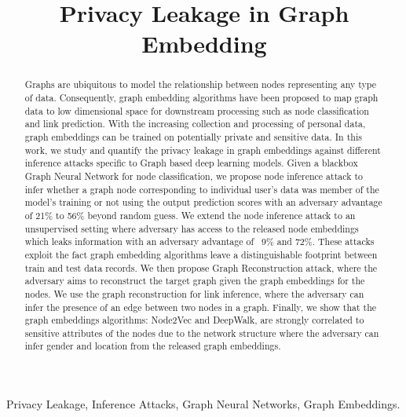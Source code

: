 \documentclass[conference]{IEEEtran}
\begin{document}

\title{Privacy Leakage in Graph Embedding}






\maketitle

\begin{abstract}
Graphs are ubiquitous to model the relationship between nodes representing any type of data.
Consequently, graph embedding algorithms have been proposed to map graph data to low dimensional space for downstream processing such as node classification and link prediction.
With the increasing collection and processing of personal data, graph embeddings can be trained on potentially private and sensitive data.
In this work, we study and quantify the privacy leakage in graph embeddings against different inference attacks specific to Graph based deep learning models.
Given a blackbox Graph Neural Network for node classification, we propose node inference attack to infer whether a graph node corresponding to individual user's data was member of the model's training or not using the output prediction scores with an adversary advantage of 21\% to 56\% beyond random guess.
We extend the node inference attack to an unsupervised setting where adversary has access to the released node embeddings which leaks information with an adversary advantage of ~9\% and 72\%.
These attacks exploit the fact graph embedding algorithms leave a distinguishable footprint between train and test data records.
We then propose Graph Reconstruction attack, where the adversary aims to reconstruct the target graph given the graph embeddings for the nodes.
We use the graph reconstruction for link inference, where the adversary can infer the presence of an edge between two nodes in a graph.
Finally, we show that the graph embeddings algorithms: Node2Vec and DeepWalk, are strongly correlated to sensitive attributes of the nodes due to the network structure where the adversary can infer gender and location from the released graph embeddings.
\end{abstract}

\begin{IEEEkeywords}
Privacy Leakage, Inference Attacks, Graph Neural Networks, Graph Embeddings.
\end{IEEEkeywords}










{\footnotesize


}
\end{document}
